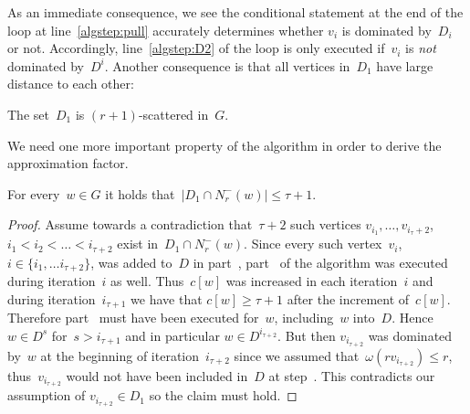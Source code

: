 \noindent
As an immediate consequence, we see the conditional statement at the end of
the loop at line~\ref{algstep:pull} accurately determines whether $v_i$ is
dominated by~$D_i$ or not. Accordingly, line~\ref{algstep:D2}
of the loop is only executed if~$v_i$ is \emph{not} dominated by~$D^i$.
Another consequence is that all vertices in~$D_1$ have large distance to
each other:

\begin{corollary}
  The set~$D_1$ is $(r+1)$-scattered in~$G$.
\end{corollary}

\noindent
We need one more important property of the algorithm in order to derive
the approximation factor.

\begin{lemma}\label{lemma:D1-intersection}
  For every~$w \in G$ it holds that~$|D_1 \cap N^-_r(w)| \leq \tau+1$.
\end{lemma}
\begin{proof}
  Assume towards a contradiction that~$\tau+2$ such vertices
  $v_{i_1},\ldots,v_{i_\tau+2}$, $i_1 < i_2 < \ldots < i_{\tau+2}$ exist in~$D_1
  \cap N^-_r(w)$. Since every such vertex~$v_i$, $i \in \{i_1,\ldots
  i_{\tau+2}\}$, was added to~$D$ in part~, part~ of the
  algorithm was executed during iteration~$i$ as well. Thus~$c[w]$ was
  increased in each iteration~$i$ and during iteration~$i_{\tau+1}$ we have that
  $c[w] \geq \tau + 1$ after the increment of~$c[w]$. Therefore part~
  must have been executed for~$w$, including~$w$ into~$D$. Hence~$w \in D^s$
  for~$s > i_{\tau+1}$ and in particular $w \in D^{i_{\tau+2}}$. But then
  $v_{i_{\tau+2}}$ was dominated by~$w$ at the beginning of iteration~$i_{\tau+2}$
  since we assumed that~$\omega(rv_{i_{\tau+2}}) \leq r$, thus~$v_{i_{\tau+2}}$
  would not have been included in~$D$ at step~. This contradicts our
  assumption of $v_{i_{\tau+2}} \in D_1$ so the claim must hold.
\end{proof}

